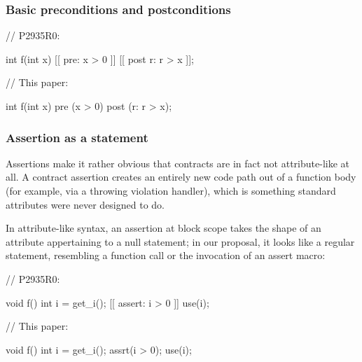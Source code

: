 \subsubsection{Basic preconditions and postconditions}

\begin{minipage}{8cm}
\begin{codeblock}
// P2935R0:

int f(int x) 
  [[ pre: x > 0 ]]
  [[ post r: r > x ]];
\end{codeblock}
\end{minipage}
\begin{minipage}{8cm}
\begin{codeblock}
// This paper:

int f(int x) 
  pre (x > 0)
  post (r: r > x);
\end{codeblock}
\end{minipage}

\subsubsection{Assertion as a statement}

Assertions make it rather obvious that contracts are in fact not attribute-like at all. A contract assertion creates an entirely new code path out of a function body (for example, via a throwing violation handler), which is something standard attributes were never designed to do. 

In attribute-like syntax, an assertion at block scope takes the shape of an attribute appertaining to a null statement; in our proposal, it looks like a regular statement, resembling a function call or the invocation of an assert macro:
\vspace{5mm}

\begin{minipage}{8cm}
\begin{codeblock}
// P2935R0:

void f() {
  int i = get_i();
  [[ assert: i > 0 ]]
  use(i);
}
\end{codeblock}
\end{minipage}
\begin{minipage}{8cm}
\begin{codeblock}
// This paper:

void f() {
  int i = get_i();
  assrt(i > 0);
  use(i);
}
\end{codeblock}
\end{minipage}

